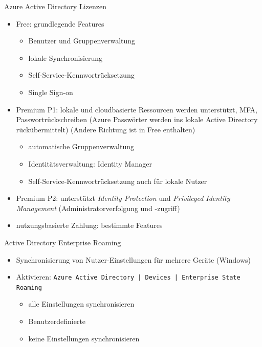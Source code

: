 
\begin{flashcard}[Definition]{Azure Active Directory Lizenzen}
    \begin{itemize}
        \item Free: grundlegende Features
            \begin{itemize}
                \item Benutzer und Gruppenverwaltung
                \item lokale Synchronisierung
                \item Self-Service-Kennwortrücksetzung
                \item Single Sign-on
            \end{itemize}
        \item Premium P1: lokale und cloudbasierte Ressourcen werden unterstützt, MFA, Passwortrückschreiben (Azure Passwörter werden ins lokale Active Directory rückübermittelt) (Andere Richtung ist in Free enthalten)
            \begin{itemize}
                \item automatische Gruppenverwaltung
                \item Identitätsverwaltung: Identity Manager
                \item Self-Service-Kennwortrücksetzung auch für lokale Nutzer
            \end{itemize}
        \item Premium P2:
                unterstützt \emph{Identity Protection} und \emph{Privileged Identity Management} (Administratorverfolgung und -zugriff)
        \item nutzungsbasierte Zahlung: bestimmte Features
    \end{itemize}
\end{flashcard}

\begin{flashcard}[Definition]{Active Directory Enterprise Roaming}
    \begin{itemize}
        \item Synchronisierung von Nutzer-Einstellungen für mehrere Geräte (Windows)
        \item Aktivieren:\newline
            \texttt{Azure Active Directory | Devices | Enterprise State Roaming}
            \begin{itemize}
                \item alle Einstellungen synchronisieren
                \item Benutzerdefinierte
                \item keine Einstellungen synchronisieren
            \end{itemize}
    \end{itemize}
\end{flashcard}

